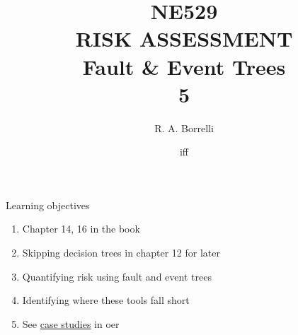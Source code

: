 \documentclass[aspectratio=1610,pdftex,dvipsnames,compress,xcolor={dvipsnames}]{beamer}
\title[NE529 -- Risk Assessment]{NE529\\RISK ASSESSMENT\\Fault \& Event Trees\\5}
\author[@TheDoctorRAB]{R. A. Borrelli}
\institute[]{
    \acl{ui}\\
    \vspace{0.10in}
    }
\date{\acl{iff}}
\newcommand{\acs}{\acrshort} %
\begin{document}
\nobibliography* %


{
    \begin{frame}[plain]{}
        \titlepage
    \end{frame}
}


\begin{frame}{Learning objectives}
    \begin{enumerate}[series=outerlist,topsep=0pt,itemsep=21pt,leftmargin=*,label=(\arabic*)]
        \item[]Chapter 14, 16 in the book
        \item[]Skipping decision trees in chapter 12 for later
        \item[]Quantifying risk using fault and event trees
        \item[]Identifying where these tools fall short
        \item[]See \href{https://uidaho.pressbooks.pub/riskassessment/}{case studies} in \acs{oer}
    \end{enumerate}
\end{frame}
\end{document}
